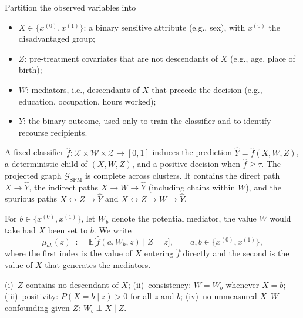 \begin{definition}
\label{def:sfm}
Partition the observed variables into
\begin{itemize}[nosep]
  \item $X\in\{x^{(0)},x^{(1)}\}$: a binary sensitive attribute (e.g., sex),
        with $x^{(0)}$ the disadvantaged group;
  \item $Z$: pre-treatment covariates that are not descendants of $X$
        (e.g., age, place of birth);
  \item $W$: mediators, i.e., descendants of $X$ that precede the decision
        (e.g., education, occupation, hours worked);
  \item $Y$: the binary outcome, used only to train the classifier and to
        identify recourse recipients.
\end{itemize}
A fixed classifier $\hat f:\mathcal X\times\mathcal W\times\mathcal Z\to[0,1]$
induces the prediction $\hat Y=\hat f(X,W,Z)$, a deterministic child of
$(X,W,Z)$, and a positive decision when $\hat f\ge\tau$. The projected graph
$\mathcal G_{\mathrm{SFM}}$ is complete across clusters. It contains the direct
path $X\to\hat Y$, the indirect paths $X\to W\to\hat Y$ (including chains within
$W$), and the spurious paths $X\leftrightarrow Z\to\hat Y$ and
$X\leftrightarrow Z\to W\to\hat Y$.
\end{definition}

\noindent For $b\in\{x^{(0)},x^{(1)}\}$, let $W_b$ denote the potential
mediator, the value $W$ would take had $X$ been set to $b$. We write
\begin{equation}
  \mu_{ab}(z)\;:=\;\mathbb E\bigl[\hat f(a,W_b,z)\mid Z=z\bigr],
  \qquad a,b\in\{x^{(0)},x^{(1)}\},
  \label{eq:mu_ab}
\end{equation}
where the first index is the value of $X$ entering $\hat f$ directly and the
second is the value of $X$ that generates the mediators.

\begin{assumption}
\label{ass:ident}
(i)~$Z$ contains no descendant of $X$;
(ii)~consistency: $W=W_b$ whenever $X=b$;
(iii)~positivity: $P(X=b\mid z)>0$ for all $z$ and $b$;
(iv)~no unmeasured $X$--$W$ confounding given $Z$: $W_b\perp X\mid Z$.
\end{assumption}

